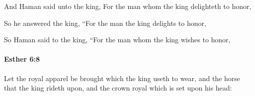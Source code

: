 			\begin{versebox}
					\item[BHS] 
					\item[LXX] 
					\item[ASV] And Haman said unto the king, For the man whom the king delighteth to honor,
					\item[NIV] So he answered the king, “For the man the king delights to honor,
					\item[NRSV] So Haman said to the king, “For the man whom the king wishes to honor,
			\end{versebox}

		\paragraph{Esther 6:8} %
			\label{ESTHER-6-8}

			Let the royal apparel be brought which the king useth to wear, and the horse that the king rideth upon, and the crown royal which is set upon his head:

